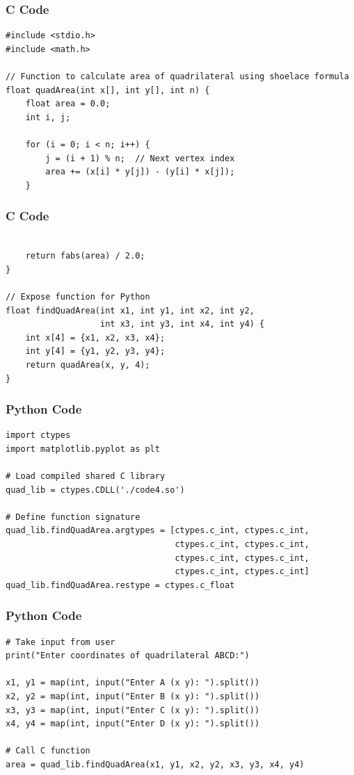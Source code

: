 \documentclass{beamer}
\begin{document}
\begin{frame}[fragile]
    \frametitle{C Code }
\begin{lstlisting}
#include <stdio.h>
#include <math.h>

// Function to calculate area of quadrilateral using shoelace formula
float quadArea(int x[], int y[], int n) {
    float area = 0.0;
    int i, j;

    for (i = 0; i < n; i++) {
        j = (i + 1) % n;  // Next vertex index
        area += (x[i] * y[j]) - (y[i] * x[j]);
    }
\end{lstlisting}
\end{frame}

\begin{frame}[fragile]
\frametitle{C Code}
\begin{lstlisting}
    
    return fabs(area) / 2.0;
}

// Expose function for Python
float findQuadArea(int x1, int y1, int x2, int y2,
                   int x3, int y3, int x4, int y4) {
    int x[4] = {x1, x2, x3, x4};
    int y[4] = {y1, y2, y3, y4};
    return quadArea(x, y, 4);
}
\end{lstlisting}
\end{frame}


\begin{frame}[fragile]
    \frametitle{Python Code }
\begin{lstlisting}
import ctypes
import matplotlib.pyplot as plt

# Load compiled shared C library
quad_lib = ctypes.CDLL('./code4.so')

# Define function signature
quad_lib.findQuadArea.argtypes = [ctypes.c_int, ctypes.c_int,
                                  ctypes.c_int, ctypes.c_int,
                                  ctypes.c_int, ctypes.c_int,
                                  ctypes.c_int, ctypes.c_int]
quad_lib.findQuadArea.restype = ctypes.c_float

\end{lstlisting}
\end{frame}


\begin{frame}[fragile]
    \frametitle{Python Code }
\begin{lstlisting}
# Take input from user
print("Enter coordinates of quadrilateral ABCD:")

x1, y1 = map(int, input("Enter A (x y): ").split())
x2, y2 = map(int, input("Enter B (x y): ").split())
x3, y3 = map(int, input("Enter C (x y): ").split())
x4, y4 = map(int, input("Enter D (x y): ").split())

# Call C function
area = quad_lib.findQuadArea(x1, y1, x2, y2, x3, y3, x4, y4)

\end{lstlisting}
\end{frame}
\end{document}
